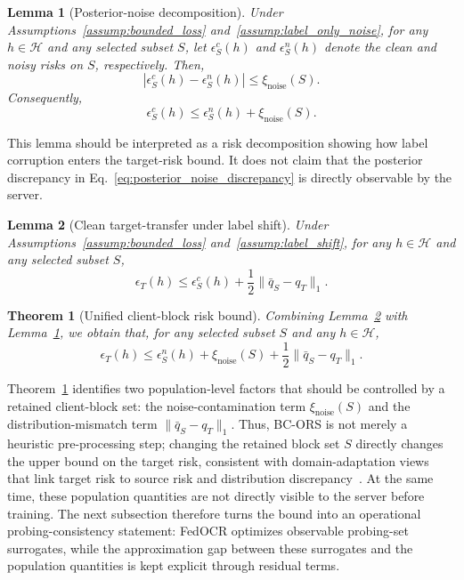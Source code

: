 ﻿\documentclass[conference]{IEEEtran}
\newtheorem{theorem}{Theorem}
\newtheorem{lemma}{Lemma}
\theoremstyle{definition}
\theoremstyle{remark}
\begin{document}
\begin{lemma}[Posterior-noise decomposition]
\label{lem:noise_bridge}
Under Assumptions~\ref{assump:bounded_loss} and~\ref{assump:label_only_noise}, 
for any $h\in\mathcal H$ and any selected subset $S$, let
$\epsilon_S^c(h)$ and $\epsilon_S^n(h)$ denote the clean and noisy risks on $S$, respectively. Then,
\begin{equation}
\label{eq:clean_noisy_bridge}
\left|
\epsilon_S^c(h)-\epsilon_S^n(h)
\right|
\le
\xi_{\mathrm{noise}}(S).
\end{equation}
Consequently,
\begin{equation}
\epsilon_S^c(h)
\le
\epsilon_S^n(h)
+
\xi_{\mathrm{noise}}(S).
\end{equation}
\end{lemma}

This lemma should be interpreted as a risk decomposition showing how label corruption enters the target-risk bound.
It does not claim that the posterior discrepancy in Eq.~\eqref{eq:posterior_noise_discrepancy} is directly observable by the server.

\begin{lemma}[Clean target-transfer under label shift]
\label{lem:label_shift_transfer}
Under Assumptions~\ref{assump:bounded_loss} and~\ref{assump:label_shift}, for any $h\in\mathcal{H}$ and any selected subset $S$,
\begin{equation}
\label{eq:clean_transfer}
\epsilon_T(h)
\le
\epsilon_S^c(h)
+
\frac{1}{2}\|\bar q_S-q_T\|_1.
\end{equation}
\end{lemma}



\begin{theorem}[Unified client-block risk bound]
\label{thm:main_bound}
Combining Lemma~\ref{lem:label_shift_transfer} with Lemma~\ref{lem:noise_bridge}, we obtain that, for any selected subset $S$ and any $h\in\mathcal{H}$,
\begin{equation}
\label{eq:main_bound}
\epsilon_T(h)
\le
\epsilon_S^n(h)
+
\xi_{\mathrm{noise}}(S)
+
\frac{1}{2}\|\bar q_S-q_T\|_1.
\end{equation}
\end{theorem}

Theorem~\ref{thm:main_bound} identifies two population-level factors that should be controlled by a retained client-block set: the noise-contamination term $\xi_{\mathrm{noise}}(S)$ and the distribution-mismatch term $\|\bar q_S-q_T\|_1$.
Thus, BC-ORS is not merely a heuristic pre-processing step; changing the retained block set $S$ directly changes the upper bound on the target risk, consistent with domain-adaptation views that link target risk to source risk and distribution discrepancy~\cite{bendavid2006analysis,ben2010theory}.
At the same time, these population quantities are not directly visible to the server before training.
The next subsection therefore turns the bound into an operational probing-consistency statement: FedOCR optimizes observable probing-set surrogates, while the approximation gap between these surrogates and the population quantities is kept explicit through residual terms.
\end{document}
